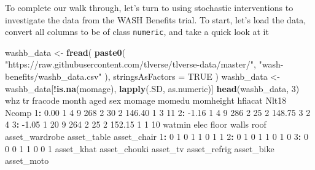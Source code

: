 \documentclass[12pt, krantz2,]{krantz}
\newenvironment{Shaded}{\begin{snugshade}}{\end{snugshade}}
\newcommand{\DataTypeTok}[1]{\textcolor[rgb]{0.27,0.27,0.27}{#1}}
\newcommand{\DecValTok}[1]{\textcolor[rgb]{0.06,0.06,0.06}{#1}}
\newcommand{\FloatTok}[1]{\textcolor[rgb]{0.06,0.06,0.06}{#1}}
\newcommand{\KeywordTok}[1]{\textcolor[rgb]{0.27,0.27,0.27}{\textbf{#1}}}
\newcommand{\NormalTok}[1]{#1}
\newcommand{\OperatorTok}[1]{\textcolor[rgb]{0.43,0.43,0.43}{\textbf{#1}}}
\newcommand{\OtherTok}[1]{\textcolor[rgb]{0.37,0.37,0.37}{#1}}
\newcommand{\StringTok}[1]{\textcolor[rgb]{0.5,0.5,0.5}{#1}}
\theoremstyle{definition}
\theoremstyle{definition}
\theoremstyle{definition}
\newcommand{\1}{\mathbbm{1}}
\begin{document}
To complete our walk through, let's turn to using stochastic interventions to
investigate the data from the WASH Benefits trial. To start, let's load the
data, convert all columns to be of class \texttt{numeric}, and take a quick look at it

\begin{Shaded}
\begin{Highlighting}[]
\NormalTok{washb_data <-}\StringTok{ }\KeywordTok{fread}\NormalTok{(}
  \KeywordTok{paste0}\NormalTok{(}
    \StringTok{"https://raw.githubusercontent.com/tlverse/tlverse-data/master/"}\NormalTok{,}
    \StringTok{"wash-benefits/washb_data.csv"}
\NormalTok{  ),}
  \DataTypeTok{stringsAsFactors =} \OtherTok{TRUE}
\NormalTok{)}
\NormalTok{washb_data <-}\StringTok{ }\NormalTok{washb_data[}\OperatorTok{!}\KeywordTok{is.na}\NormalTok{(momage), }\KeywordTok{lapply}\NormalTok{(.SD, as.numeric)]}
\KeywordTok{head}\NormalTok{(washb_data, }\DecValTok{3}\NormalTok{)}
\NormalTok{     whz tr fracode month aged sex momage momedu momheight hfiacat Nlt18 Ncomp}
\DecValTok{1}\OperatorTok{:}\StringTok{  }\FloatTok{0.00}  \DecValTok{1}       \DecValTok{4}     \DecValTok{9}  \DecValTok{268}   \DecValTok{2}     \DecValTok{30}      \DecValTok{2}    \FloatTok{146.40}       \DecValTok{1}     \DecValTok{3}    \DecValTok{11}
\DecValTok{2}\OperatorTok{:}\StringTok{ }\FloatTok{-1.16}  \DecValTok{1}       \DecValTok{4}     \DecValTok{9}  \DecValTok{286}   \DecValTok{2}     \DecValTok{25}      \DecValTok{2}    \FloatTok{148.75}       \DecValTok{3}     \DecValTok{2}     \DecValTok{4}
\DecValTok{3}\OperatorTok{:}\StringTok{ }\FloatTok{-1.05}  \DecValTok{1}      \DecValTok{20}     \DecValTok{9}  \DecValTok{264}   \DecValTok{2}     \DecValTok{25}      \DecValTok{2}    \FloatTok{152.15}       \DecValTok{1}     \DecValTok{1}    \DecValTok{10}
\NormalTok{   watmin elec floor walls roof asset_wardrobe asset_table asset_chair}
\DecValTok{1}\OperatorTok{:}\StringTok{      }\DecValTok{0}    \DecValTok{1}     \DecValTok{0}     \DecValTok{1}    \DecValTok{1}              \DecValTok{0}           \DecValTok{1}           \DecValTok{1}
\DecValTok{2}\OperatorTok{:}\StringTok{      }\DecValTok{0}    \DecValTok{1}     \DecValTok{0}     \DecValTok{1}    \DecValTok{1}              \DecValTok{0}           \DecValTok{1}           \DecValTok{0}
\DecValTok{3}\OperatorTok{:}\StringTok{      }\DecValTok{0}    \DecValTok{0}     \DecValTok{0}     \DecValTok{1}    \DecValTok{1}              \DecValTok{0}           \DecValTok{0}           \DecValTok{1}
\NormalTok{   asset_khat asset_chouki asset_tv asset_refrig asset_bike asset_moto}

\end{Highlighting}
\end{Shaded}
\end{document}
